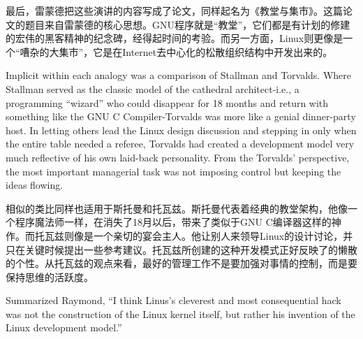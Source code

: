 \ifdefined\chs
最后，雷蒙德把这些演讲的内容写成了论文，同样起名为《教堂与集市》。这篇论文的题目来自雷蒙德的核心思想。GNU程序就是“教堂”，它们都是有计划的修建的宏伟的黑客精神的纪念碑，经得起时间的考验。而另一方面，Linux则更像是一个“嘈杂的大集市”，它是在Internet去中心化的松散组织结构中开发出来的。
\fi



\ifdefined\eng
Implicit within each analogy was a comparison of Stallman and Torvalds. Where Stallman served as the classic model of the cathedral architect-i.e., a programming ``wizard'' who could disappear for 18 months and return with something like the GNU C Compiler-Torvalds was more like a genial dinner-party host. In letting others lead the Linux design discussion and stepping in only when the entire table needed a referee, Torvalds had created a development model very much reflective of his own laid-back personality. From the Torvalds' perspective, the most important managerial task was not imposing control but keeping the ideas flowing.
\fi

\ifdefined\chs
相似的类比同样也适用于斯托曼和托瓦兹。斯托曼代表着经典的教堂架构，他像一个程序魔法师一样，在消失了18月以后，带来了类似于GNU C编译器这样的神作。而托瓦兹则像是一个亲切的宴会主人。他让别人来领导Linux的设计讨论，并只在关键时候提出一些参考建议。托瓦兹所创建的这种开发模式正好反映了的懒散的个性。从托瓦兹的观点来看，最好的管理工作不是要加强对事情的控制，而是要保持思维的活跃度。
\fi

\ifdefined\eng
Summarized Raymond, ``I think Linus's cleverest and most consequential hack was not the construction of the Linux kernel itself, but rather his invention of the Linux development model.''
\fi

